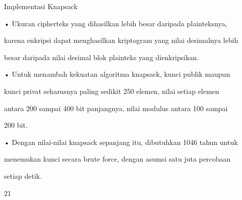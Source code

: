 \documentclass{article}
\begin{document}

Implementasi Knapsack

• Ukuran cipherteks yang dihasilkan lebih besar daripada plainteksnya, 

karena enkripsi dapat menghasilkan kriptogram yang nilai desimalnya lebih 

besar daripada nilai desimal blok plainteks yang dienkripsikan.

• Untuk menambah kekuatan algoritma knapsack, kunci publik maupun 

kunci privat seharusnya paling sedikit 250 elemen, nilai setiap elemen 

antara 200 sampai 400 bit panjangnya, nilai modulus antara 100 sampai 

200 bit. 

• Dengan nilai-nilai knapsack sepanjang itu, dibutuhkan 1046 tahun untuk 

menemukan kunci secara brute force, dengan asumsi satu juta percobaan 

setiap detik.

21
\end{document}
